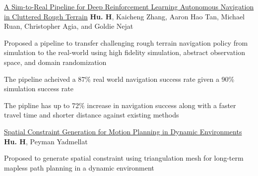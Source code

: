 


\begin{cventries}
  \cvpublicationentrysimple
    {\href{https://ieeexplore.ieee.org/document/9468918}{A Sim-to-Real Pipeline for Deep Reinforcement Learning Autonomous Navigation in Cluttered Rough Terrain}} %
    {\textbf{Hu. H}, Kaicheng Zhang, Aaron Hao Tan, Michael Ruan, Christopher Agia, and Goldie Nejat \hspace*{0pt}\hfill {}} %
    {
    \begin{cvitems}
      \item{
        Proposed a pipeline to transfer challenging rough terrain navigation policy from simulation to the real-world using high fidelity simulation, abstract observation space, and domain randomization
      }
      \item{
        The pipeline acheived a 87\% real world navigation success rate given a 90\% simulation success rate
			}
      \item{
				The pipline has up to 72\% increase in navigation success along with a faster travel time and shorter distance against existing methods
      }
    \end{cvitems}
    }
  \cvpublicationentrysimple
    {\href{https://arxiv.org/abs/2110.14786}{Spatial Constraint Generation for Motion Planning in Dynamic Environments}} %
    {\textbf{Hu. H}, Peyman Yadmellat \hspace*{0pt}\hfill {}} %
    {
    \begin{cvitems}
      \item {Proposed to generate spatial constraint using triangulation mesh for long-term mapless path planning in a dynamic environment}

\end{cvitems}}
\end{cventries}
